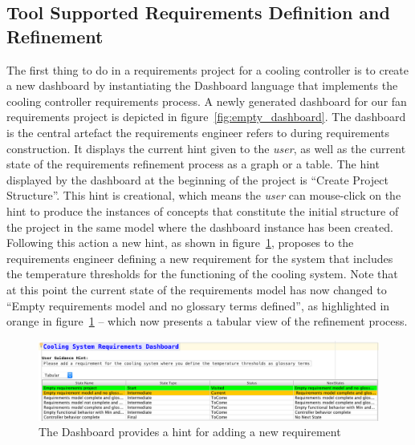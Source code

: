 \subsection*{Tool Supported Requirements Definition and Refinement}
\vspace{-.1cm}
The first thing to do in a requirements project for a cooling controller is to
create a new dashboard by instantiating the \textsf{Dashboard} language that
implements the cooling controller requirements process. A newly generated
dashboard for our fan requirements project is depicted in
figure~\ref{fig:empty_dashboard}.
The dashboard is the central artefact the requirements engineer refers to during
requirements construction. It displays the current hint given to the
\emph{user}, as well as the current state of the requirements refinement process
as a graph or a table. The hint displayed by the dashboard at the beginning of
the project is ``Create Project Structure''. This hint is creational, which
means the \emph{user} can mouse-click on the hint to produce the instances of
concepts that constitute the initial structure of the project in the same model
where the dashboard instance has been created. Following this action a new hint,
as shown in figure~\ref{fig:dashboard_newreq}, proposes to the requirements
engineer defining a new requirement for the system that includes the temperature
thresholds for the functioning of the cooling system.
Note that at this point the current state of the requirements model has now
changed to ``Empty requirements model and no glossary terms defined'', as
highlighted in orange in figure~\ref{fig:dashboard_newreq} -- which now presents
a tabular view of the refinement process.
\vspace{-.6cm}
\begin{figure}[!h]
\centering 
\includegraphics[width=1\textwidth]{./figures/DefineCoolingReq.png}
\vspace{-.7cm}
\caption{The Dashboard provides a hint for adding a new requirement}
\label{fig:dashboard_newreq}
\vspace{-.7cm}
\end{figure}

